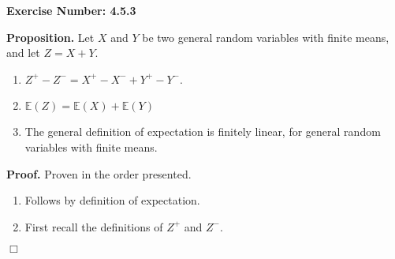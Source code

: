 \documentclass{article}
\begin{document}
\noindent \textbf{Exercise Number: 4.5.3}  %

\medskip 

\noindent \textbf{Proposition.} Let $X$ and $Y$ be two general random variables with finite means, and let $Z = X + Y$. 

\begin{enumerate}

\item $Z^+ - Z^- = X^+ - X^- + Y^+ - Y^-$. 

\item $\mathbb{E}(Z) = \mathbb{E}(X) + \mathbb{E}(Y)$

\item The general definition of expectation is finitely linear, for general random variables with finite means. 

\end{enumerate}

\bigskip

\noindent \textbf{Proof.} Proven in the order presented.  

\begin{enumerate}

\item Follows by definition of expectation. 

\item First recall the definitions of $Z^+$ and $Z^-$. 

\end{enumerate}

\hfill $\Box$
\end{document}
